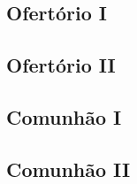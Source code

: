 \AllowPageFlush

\subsection{Ofertório I}\label{subsection:communia/commune-martyrum/offertorium-1}

\AllowPageFlush

\subsection{Ofertório II}\label{subsection:communia/commune-martyrum/offertorium-2}

\AllowPageFlush

\subsection{Comunhão I}\label{subsection:communia/commune-martyrum/communio-1}

\AllowPageFlush

\subsection{Comunhão II}\label{subsection:communia/commune-martyrum/communio-2}
